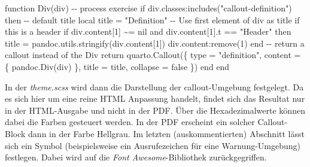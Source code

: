 \documentclass[
  letterpaper,
  DIV=11]{scrartcl}
\newenvironment{Shaded}{\begin{snugshade}}{\end{snugshade}}
\newcommand{\CommentTok}[1]{\textcolor[rgb]{0.37,0.37,0.37}{#1}}
\newcommand{\ControlFlowTok}[1]{\textcolor[rgb]{0.00,0.23,0.31}{#1}}
\newcommand{\DecValTok}[1]{\textcolor[rgb]{0.68,0.00,0.00}{#1}}
\newcommand{\FunctionTok}[1]{\textcolor[rgb]{0.28,0.35,0.67}{#1}}
\newcommand{\KeywordTok}[1]{\textcolor[rgb]{0.00,0.23,0.31}{#1}}
\newcommand{\NormalTok}[1]{\textcolor[rgb]{0.00,0.23,0.31}{#1}}
\newcommand{\OperatorTok}[1]{\textcolor[rgb]{0.37,0.37,0.37}{#1}}
\newcommand{\StringTok}[1]{\textcolor[rgb]{0.13,0.47,0.30}{#1}}
\newcommand{\VariableTok}[1]{\textcolor[rgb]{0.07,0.07,0.07}{#1}}
\begin{document}
\begin{Shaded}
\begin{Highlighting}[]
\KeywordTok{function}\NormalTok{ Div}\OperatorTok{(}\VariableTok{div}\OperatorTok{)}
  \CommentTok{{-}{-} process exercise}
  \ControlFlowTok{if} \VariableTok{div}\OperatorTok{.}\VariableTok{classes}\OperatorTok{:}\NormalTok{includes}\OperatorTok{(}\StringTok{"callout{-}definition"}\OperatorTok{)} \ControlFlowTok{then}
    \CommentTok{{-}{-} default title}
    \KeywordTok{local} \VariableTok{title} \OperatorTok{=} \StringTok{"Definition"}
    \CommentTok{{-}{-} Use first element of div as title if this is a header}
    \ControlFlowTok{if} \VariableTok{div}\OperatorTok{.}\VariableTok{content}\OperatorTok{[}\DecValTok{1}\OperatorTok{]} \OperatorTok{\textasciitilde{}=} \KeywordTok{nil} \KeywordTok{and} \VariableTok{div}\OperatorTok{.}\VariableTok{content}\OperatorTok{[}\DecValTok{1}\OperatorTok{].}\VariableTok{t} \OperatorTok{==} \StringTok{"Header"} \ControlFlowTok{then}
      \VariableTok{title} \OperatorTok{=} \VariableTok{pandoc}\OperatorTok{.}\VariableTok{utils}\OperatorTok{.}\NormalTok{stringify}\OperatorTok{(}\VariableTok{div}\OperatorTok{.}\VariableTok{content}\OperatorTok{[}\DecValTok{1}\OperatorTok{])}
      \VariableTok{div}\OperatorTok{.}\VariableTok{content}\OperatorTok{:}\FunctionTok{remove}\OperatorTok{(}\DecValTok{1}\OperatorTok{)}
    \ControlFlowTok{end}
    \CommentTok{{-}{-} return a callout instead of the Div}
    \ControlFlowTok{return} \VariableTok{quarto}\OperatorTok{.}\NormalTok{Callout}\OperatorTok{(\{}
      \FunctionTok{type} \OperatorTok{=} \StringTok{"definition"}\OperatorTok{,}
      \VariableTok{content} \OperatorTok{=} \OperatorTok{\{} \VariableTok{pandoc}\OperatorTok{.}\NormalTok{Div}\OperatorTok{(}\VariableTok{div}\OperatorTok{)} \OperatorTok{\},}
      \VariableTok{title} \OperatorTok{=} \VariableTok{title}\OperatorTok{,}
      \VariableTok{collapse} \OperatorTok{=} \KeywordTok{false}
    \OperatorTok{\})}
  \ControlFlowTok{end}
\KeywordTok{end}
\end{Highlighting}
\end{Shaded}

In der \emph{theme.scss} wird dann die Darstellung der callout-Umgebung
festgelegt. Da es sich hier um eine reine HTML Anpassung handelt, findet
sich das Resultat nur in der HTML-Ausgabe und nicht in der PDF. Über die
Hexadezimalwerte können dabei die Farben gesteuert werden. In der PDF
erscheint ein solcher Callout-Block dann in der Farbe Hellgrau. Im
letzten (auskommentierten) Abschnitt lässt sich ein Symbol
(beispielsweise ein Ausrufezeichen für eine Warnung-Umgebung) festlegen.
Dabei wird auf die \emph{Font Awesome}-Bibliothek zurückgegriffen.
\end{document}
